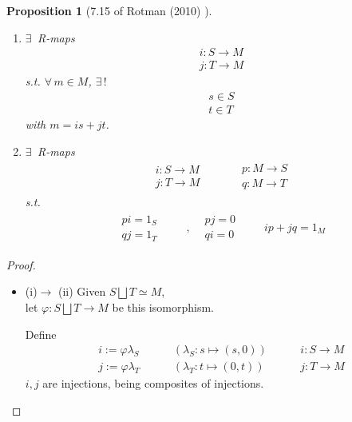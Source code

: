 \documentclass[10pt]{amsart}
\newtheorem{proposition}{Proposition}
\begin{document}
\begin{multicols*}{2}
\begin{proposition}[7.15 of Rotman (2010) \cite{JRotman2010}]
\begin{enumerate}
\begin{equation}
\begin{gathered} 
M = \text{im}(i) + \text{im}(j)  \text{ and } \\ 
\text{im}(i) \bigcap \text{im}(j) = \lbrace 0 \rbrace  
\end{gathered}
\end{equation}
\item[(iii)] $\exists \, $ R-maps 
\[
\begin{aligned}
	& i : S\to M \\ 
	& j : T\to M 
\end{aligned}
\]
s.t. $\forall \, m \in M$, $\exists \, !$ 
\[
\begin{aligned}
	& s \in S \\ 
	& t \in T 
\end{aligned}
\] with $m=is + jt$.  
\item[(iv)] $\exists \, $ R-maps 
\[
\begin{gathered}
\begin{aligned}  & i: S\to M \\ 
& j:T \to M \end{aligned} \qquad \, \begin{aligned}
& p : M \to S \\ 
& q : M \to T \end{aligned}
\end{gathered}
\]
s.t. 
\[
\begin{gathered}
	\begin{aligned}
	& pi = 1_S \\ 
& qj = 1_T 
\end{aligned} \qquad \ , \begin{aligned}
	& pj = 0  \\
	& qi = 0 
\end{aligned} \qquad \, ip + jq = 1_M
\end{gathered}
\]
\end{enumerate}
\end{proposition}

\begin{proof}
\begin{itemize}
\item (i)$\to$ (ii)  Given $S \bigsqcup T \simeq  M$,  \\ 
 let $\varphi : S \bigsqcup T \to   M$ be this isomorphism.  

Define
\[
\begin{aligned}
	& i:= \varphi \lambda_S \qquad \, & (\lambda_S : s\mapsto (s,0)) \qquad \, & i :S \to M \\ 
	& j:= \varphi \lambda_T \qquad \, & (\lambda_T : t\mapsto (0,t)) \qquad \, & j :T \to M 
\end{aligned}
\]
$i,j$ are injections, being composites of injections.  


\end{itemize}
\end{proof}
\end{multicols*}
\end{document}
